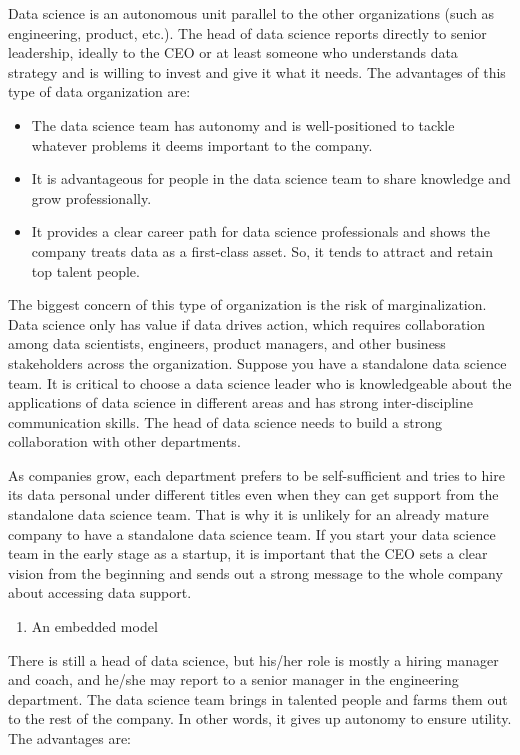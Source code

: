 \documentclass[12pt,]{krantz}
\providecommand{\tightlist}{%
  \setlength{\itemsep}{0pt}\setlength{\parskip}{0pt}}
\begin{document}
Data science is an autonomous unit parallel to the other organizations (such as engineering, product, etc.). The head of data science reports directly to senior leadership, ideally to the CEO or at least someone who understands data strategy and is willing to invest and give it what it needs. The advantages of this type of data organization are:

\begin{itemize}
\tightlist
\item
  The data science team has autonomy and is well-positioned to tackle whatever problems it deems important to the company.
\item
  It is advantageous for people in the data science team to share knowledge and grow professionally.
\item
  It provides a clear career path for data science professionals and shows the company treats data as a first-class asset. So, it tends to attract and retain top talent people.
\end{itemize}

The biggest concern of this type of organization is the risk of marginalization. Data science only has value if data drives action, which requires collaboration among data scientists, engineers, product managers, and other business stakeholders across the organization. Suppose you have a standalone data science team. It is critical to choose a data science leader who is knowledgeable about the applications of data science in different areas and has strong inter-discipline communication skills. The head of data science needs to build a strong collaboration with other departments.

As companies grow, each department prefers to be self-sufficient and tries to hire its data personal under different titles even when they can get support from the standalone data science team. That is why it is unlikely for an already mature company to have a standalone data science team. If you start your data science team in the early stage as a startup, it is important that the CEO sets a clear vision from the beginning and sends out a strong message to the whole company about accessing data support.

\begin{enumerate}
\def\labelenumi{(\arabic{enumi})}
\setcounter{enumi}{1}
\tightlist
\item
  An embedded model
\end{enumerate}

There is still a head of data science, but his/her role is mostly a hiring manager and coach, and he/she may report to a senior manager in the engineering department. The data science team brings in talented people and farms them out to the rest of the company. In other words, it gives up autonomy to ensure utility. The advantages are:
\end{document}
